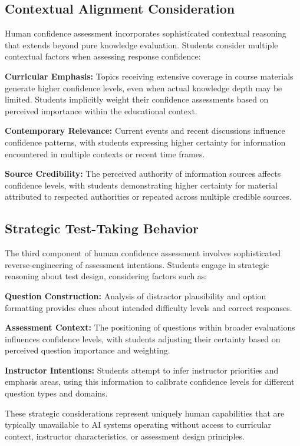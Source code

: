 \documentclass[sigconf]{acmart}
\begin{document}
\subsection{Contextual Alignment Consideration}

Human confidence assessment incorporates sophisticated contextual reasoning that extends beyond pure knowledge evaluation. Students consider multiple contextual factors when assessing response confidence:

\textbf{Curricular Emphasis:} Topics receiving extensive coverage in course materials generate higher confidence levels, even when actual knowledge depth may be limited. Students implicitly weight their confidence assessments based on perceived importance within the educational context.

\textbf{Contemporary Relevance:} Current events and recent discussions influence confidence patterns, with students expressing higher certainty for information encountered in multiple contexts or recent time frames.

\textbf{Source Credibility:} The perceived authority of information sources affects confidence levels, with students demonstrating higher certainty for material attributed to respected authorities or repeated across multiple credible sources.

\subsection{Strategic Test-Taking Behavior}

The third component of human confidence assessment involves sophisticated reverse-engineering of assessment intentions. Students engage in strategic reasoning about test design, considering factors such as:

\textbf{Question Construction:} Analysis of distractor plausibility and option formatting provides clues about intended difficulty levels and correct responses.

\textbf{Assessment Context:} The positioning of questions within broader evaluations influences confidence levels, with students adjusting their certainty based on perceived question importance and weighting.

\textbf{Instructor Intentions:} Students attempt to infer instructor priorities and emphasis areas, using this information to calibrate confidence levels for different question types and domains.

These strategic considerations represent uniquely human capabilities that are typically unavailable to AI systems operating without access to curricular context, instructor characteristics, or assessment design principles.
\end{document}
